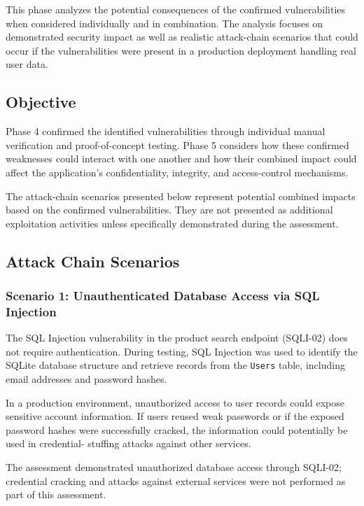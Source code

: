 This phase analyzes the potential consequences of the confirmed
vulnerabilities when considered individually and in combination.
The analysis focuses on demonstrated security impact as well as
realistic attack-chain scenarios that could occur if the
vulnerabilities were present in a production deployment handling
real user data.

\subsection*{Objective}

Phase 4 confirmed the identified vulnerabilities through individual
manual verification and proof-of-concept testing. Phase 5 considers
how these confirmed weaknesses could interact with one another and
how their combined impact could affect the application's
confidentiality, integrity, and access-control mechanisms.

The attack-chain scenarios presented below represent potential
combined impacts based on the confirmed vulnerabilities. They are
not presented as additional exploitation activities unless
specifically demonstrated during the assessment.

\subsection*{Attack Chain Scenarios}

\subsubsection*{Scenario 1: Unauthenticated Database Access via SQL Injection}

The SQL Injection vulnerability in the product search endpoint
(SQLI-02) does not require authentication. During testing, SQL
Injection was used to identify the SQLite database structure and
retrieve records from the \texttt{Users} table, including email
addresses and password hashes.

In a production environment, unauthorized access to user records
could expose sensitive account information. If users reused weak
passwords or if the exposed password hashes were successfully
cracked, the information could potentially be used in credential-
stuffing attacks against other services.

The assessment demonstrated unauthorized database access through
SQLI-02; credential cracking and attacks against external services
were not performed as part of this assessment.

